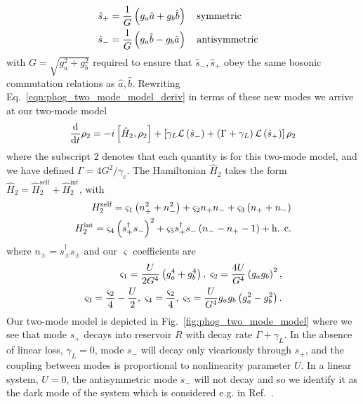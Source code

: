 \begin{align}\label{eqn:phog_rotation}
\hat{s}_+ &= \frac{1}{G} \left(g_a \hat{a} + g_b \hat{b}\right) \qq{symmetric}  \notag \\
%
\hat{s}_- &= \frac{1}{G} \left(g_a \hat{b} - g_b \hat{a}\right) \qq{antisymmetric}
\end{align}
with $G = \sqrt{ g_a^2 + g_b^2 }$ required to ensure that $\hat{s}_-, \hat{s}_+$ obey the same bosonic commutation relations as $\hat{a}, \hat{b}$. Rewriting Eq.~\ref{eqn:phog_two_mode_model_deriv} in terms of these new modes we arrive at our two-mode model
\begin{equation}\label{eqn:phog_lindblad_two_mode_model}
\frac{\mathrm{d}}{\mathrm{d}t} \rho_2 = - i \left[ \hat{H}_2, \rho_2 \right] + \left[ \gamma_L \mathcal{L}\left(\hat{s}_-\right) + \left(\Gamma + \gamma_L\right) \mathcal{L}\left(\hat{s}_+\right) \right] \rho_2
\end{equation}
where the subscript $2$ denotes that each quantity is for this two-mode model, and we have defined $\Gamma = 4 G^2 / \gamma_c$. The Hamiltonian $\hat{H}_2$ takes the form $\hat{H}_2 = \hat{H}_2^{\text{self}} + \hat{H}_2^{\text{int}}$, with
\begin{align}
H_2^{\text{self}} = \varsigma_1\left(n_+^2 + n_-^2\right) + \varsigma_2 n_+ n_- + \varsigma_3\left(n_+ + n_-\right) \notag \\
%
H_2^{\text{int}} = \varsigma_4 \left(s_+^\dagger s_-\right)^2 + \varsigma_5 s_+^\dagger s_- \left(n_- - n_+ - 1\right) + \hc
\end{align}
where $n_{\pm} = s_{\pm}^\dagger s_\pm$ and our $\varsigma$ coefficients are
\begin{align}
\varsigma_1 = \frac{U}{2 G^4} \left(g_a^4 + g_b^4\right), \; \varsigma_2 = \frac{4 U}{G^4} \left(g_a g_b\right)^2, \notag \\
%
\varsigma_3 = \frac{\varsigma_2}{4} - \frac{U}{2}, \; \varsigma_4 = \frac{\varsigma_2}{4}, \; \varsigma_5 = \frac{U}{G^4} g_a g_b \left(g_a^2 - g_b^2\right).
\end{align}
Our two-mode model is depicted in Fig.~\ref{fig:phog_two_mode_model} where we see that mode $s_+$ decays into reservoir $R$ with decay rate $\Gamma + \gamma_L$. In the absence of linear loss, $\gamma_L=0$, mode $s_-$ will decay only vicariously through $s_+$, and the coupling between modes is proportional to nonlinearity parameter $U$. In a linear system, $U = 0$, the antisymmetric mode $s_-$ will not decay and so we identify it as the dark mode of the system which is considered e.g. in Ref.~.


